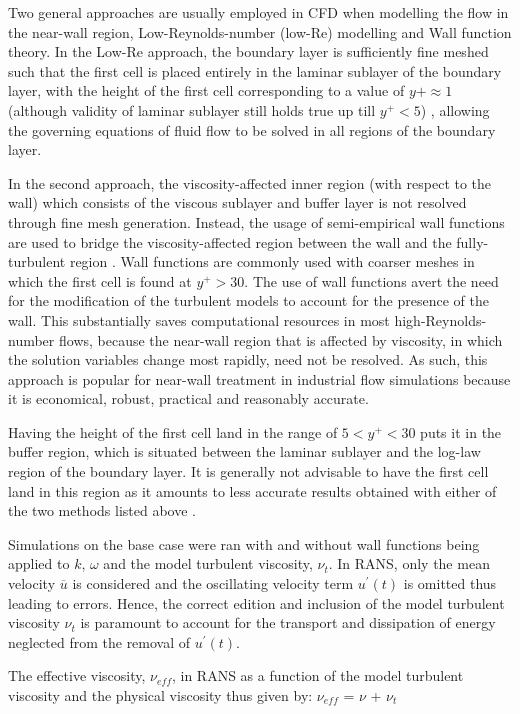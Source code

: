 Two general approaches are usually employed in CFD when modelling the flow in the near-wall region, Low-Reynolds-number (low-Re) modelling and Wall function theory.
In the Low-Re approach, the boundary layer is sufficiently fine meshed such that the first cell is placed entirely in the laminar sublayer of the boundary layer, with the height of the first cell corresponding to a value of $y+ \approx 1$ (although validity of laminar sublayer still holds true up till $y^+ < 5$) \cite{Blocken2004}, allowing the governing equations of fluid flow to be solved in all regions of the boundary layer.

In the second approach, the viscosity-affected inner region (with respect to the wall) which consists of the viscous sublayer and buffer layer is not resolved through fine mesh generation. Instead, the usage of semi-empirical wall functions are used to bridge the viscosity-affected region between the wall and the fully-turbulent region \cite{Pisarenco2011}. Wall functions are commonly used with coarser meshes in which the first cell is found at $y^+ > 30$. The use of wall functions avert the need for the modification of the turbulent models to account for the presence of the wall. This substantially saves computational resources in most high-Reynolds-number flows, because the near-wall region that is affected by viscosity, in which the solution variables change most rapidly, need not be resolved. As such, this approach is popular for near-wall treatment in industrial flow simulations because it is economical, robust, practical and reasonably accurate.

Having the height of the first cell land in the range of $5 < y^+ < 30$ puts it in the buffer region, which is situated between the laminar sublayer and the log-law region of the boundary layer. It is generally not advisable to have the first cell land in this region as it amounts to less accurate results obtained with either of the two methods listed above \cite{Salim2009}.

Simulations on the base case were ran with and without wall functions being applied to $k$, $\omega$ and the model turbulent viscosity, $\nu_t$. In RANS, only the mean velocity $\overline u$ is considered and the oscillating velocity term $u^\prime(t)$ is omitted thus leading to errors. Hence, the correct edition and inclusion of the model turbulent viscosity $\nu_t$ is paramount to account for the transport and dissipation of energy neglected from the removal of $u^\prime(t)$.

The effective viscosity, $\nu_{eff}$, in RANS as a function of the model turbulent viscosity and the physical viscosity thus given by: $\nu_{eff}$ = $\nu$ + $\nu_t$

